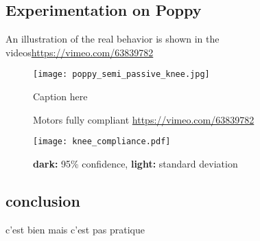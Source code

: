 \subsection{Experimentation on Poppy} %

An illustration of the real behavior is shown in the videos\url{https://vimeo.com/63839782}

\begin{figure}[h]
    \begin{center}
        \texttt{[image: poppy\_semi\_passive\_knee.jpg]}
    \end{center}
    \caption{Caption here}
    \label{fig:figure1}
\end{figure}


\begin{figure}[!h]
\centering
    \hfil
    \caption{Motors fully compliant \url{https://vimeo.com/63839782}}
    \label{fig:}
\end{figure}


\begin{figure}[h]
    \begin{center}
        \texttt{[image: knee\_compliance.pdf]}
    \end{center}
    \caption{ \textbf{dark:} 95\% confidence, \textbf{light:} standard deviation}
    \label{fig:figure1}
\end{figure}

\subsection{conclusion} %
c'est bien mais c'est pas pratique


